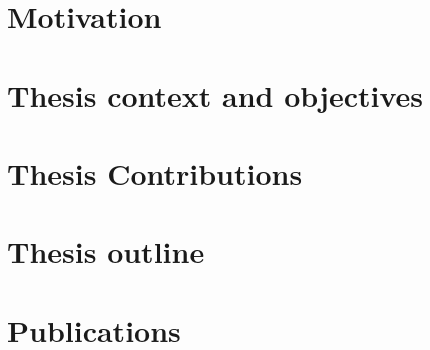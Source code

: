 
\section*{Motivation}


\section*{Thesis context and objectives}


\section*{Thesis Contributions}


\section*{Thesis outline}


\section*{Publications}

